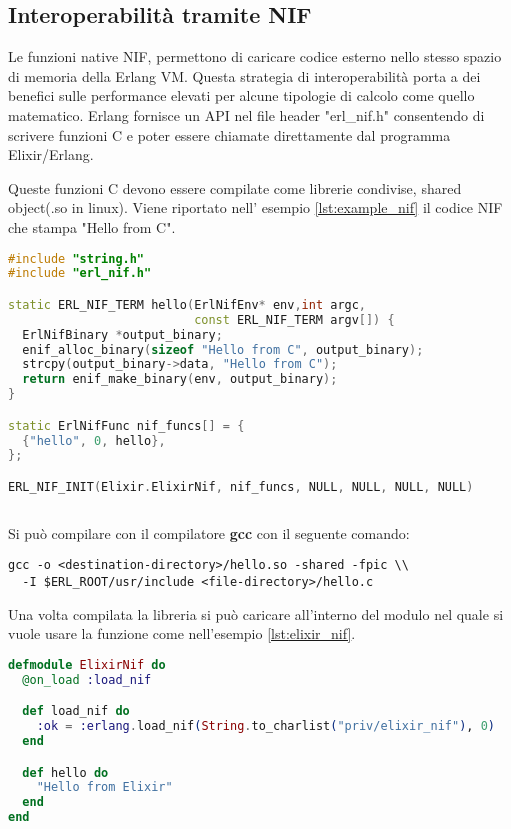 
\subsection{Interoperabilità tramite NIF}

Le funzioni native NIF, permettono di caricare codice esterno
nello stesso spazio di memoria della Erlang VM. 
Questa strategia di interoperabilità porta a dei benefici
sulle performance elevati per alcune tipologie di calcolo
come quello matematico.
Erlang fornisce un API nel file header
"erl\_nif.h" \cite{Erlanger73:online} consentendo 
di scrivere funzioni C e poter essere chiamate direttamente
dal programma Elixir/Erlang.

Queste funzioni C devono essere compilate come librerie condivise,
shared object(.so in linux). Viene riportato
nell' esempio \ref{lst:example_nif} il codice NIF
che stampa "Hello from C"\cite{adoptingElixirchap7pag126}.

\begin{lstlisting}[language=cpp,captionpos=b,
	caption={Funzione Nif},label={lst:example_nif}]
#include "string.h"
#include "erl_nif.h"

static ERL_NIF_TERM hello(ErlNifEnv* env,int argc,
                          const ERL_NIF_TERM argv[]) {
  ErlNifBinary *output_binary;
  enif_alloc_binary(sizeof "Hello from C", output_binary);
  strcpy(output_binary->data, "Hello from C");
  return enif_make_binary(env, output_binary);
}

static ErlNifFunc nif_funcs[] = {
  {"hello", 0, hello},
};

ERL_NIF_INIT(Elixir.ElixirNif, nif_funcs, NULL, NULL, NULL, NULL)
	
\end{lstlisting}

Si può compilare con il compilatore \textbf{gcc}
con il seguente comando:

\begin{lstlisting}[language=none]
gcc -o <destination-directory>/hello.so -shared -fpic \\
  -I $ERL_ROOT/usr/include <file-directory>/hello.c
\end{lstlisting}

Una volta compilata la libreria si può caricare all'interno del
modulo nel quale si vuole usare la funzione come
nell'esempio \ref{lst:elixir_nif}.

\begin{lstlisting}[language=elixir, caption={Caricamento NIF},
	captionpos=b,label={lst:elixir_nif}]
defmodule ElixirNif do
  @on_load :load_nif

  def load_nif do
	:ok = :erlang.load_nif(String.to_charlist("priv/elixir_nif"), 0)
  end

  def hello do
    "Hello from Elixir"
  end
end
\end{lstlisting}

